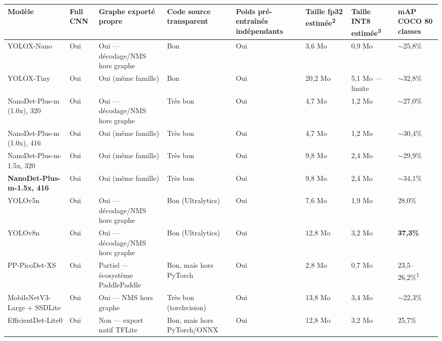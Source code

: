 \documentclass[11pt,a4paper]{article}
\begin{document}
    \begin{table}[!htbp]
    \centering
    \footnotesize
    \renewcommand{\arraystretch}{1.25}
    \begin{adjustbox}{max width=\linewidth}
    \begin{tabular}{@{}p{3.0cm}p{1.4cm}p{3.6cm}p{3.6cm}p{3.0cm}p{1.8cm}p{2.2cm}p{1.8cm}@{}}
    \toprule
    \textbf{Modèle} & \textbf{Full CNN} & \textbf{Graphe exporté propre} & \textbf{Code source transparent} & \textbf{Poids pré-entraînés indépendants} & \textbf{Taille fp32 estimée}\textsuperscript{2} & \textbf{Taille INT8 estimée}\textsuperscript{3} & \textbf{mAP COCO 80 classes} \\
    \midrule
    YOLOX-Nano & Oui & Oui --- décodage/NMS hors graphe & Bon & Oui & 3,6 Mo & 0,9 Mo & $\sim$25,8\% \\
    YOLOX-Tiny & Oui & Oui (même famille) & Bon & Oui & 20,2 Mo & 5,1 Mo --- limite & $\sim$32,8\% \\
    NanoDet-Plus-m (1.0x), 320 & Oui & Oui --- décodage/NMS hors graphe & Très bon & Oui & 4,7 Mo & 1,2 Mo & $\sim$27,0\% \\
    NanoDet-Plus-m (1.0x), 416 & Oui & Oui (même famille) & Très bon & Oui & 4,7 Mo & 1,2 Mo & $\sim$30,4\% \\
    NanoDet-Plus-m-1.5x, 320 & Oui & Oui (même famille) & Très bon & Oui & 9,8 Mo & 2,4 Mo & $\sim$29,9\% \\
    \textbf{NanoDet-Plus-m-1.5x, 416} & Oui & Oui (même famille) & Très bon & Oui & 9,8 Mo & 2,4 Mo & $\sim$34,1\% \\
    YOLOv5n & Oui & Oui --- décodage/NMS hors graphe & Bon (Ultralytics) & Oui & 7,6 Mo & 1,9 Mo & 28,0\% \\
    YOLOv8n & Oui & Oui --- décodage/NMS hors graphe & Bon (Ultralytics) & Oui & 12,8 Mo & 3,2 Mo & \textbf{37,3\%} \\
    PP-PicoDet-XS & Oui & Partiel --- écosystème PaddlePaddle & Bon, mais hors PyTorch & Oui & 2,8 Mo & 0,7 Mo & 23,5--26,2\%\textsuperscript{1} \\
    MobileNetV3-Large + SSDLite & Oui & Oui --- NMS hors graphe & Très bon (torchvision) & Oui & 13,8 Mo & 3,4 Mo & $\sim$22,3\% \\
    EfficientDet-Lite0 & Oui & Non --- export natif TFLite & Bon, mais hors PyTorch/ONNX & Oui & 12,8 Mo & 3,2 Mo & 25,7\% \\
    \bottomrule
    \end{tabular}
    \end{adjustbox}
    

\end{table}
\end{document}
